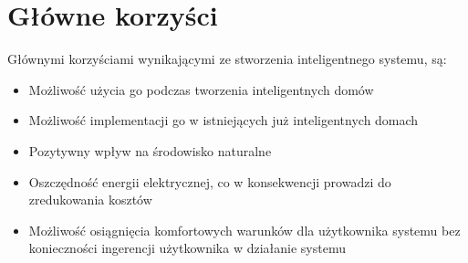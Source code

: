 \documentclass{article}
\begin{document}
\section{Główne korzyści}
Głównymi korzyściami wynikającymi ze stworzenia inteligentnego systemu, są:
\begin{itemize}
\item Możliwość użycia go podczas tworzenia inteligentnych domów
\item Możliwość implementacji go w istniejących już inteligentnych domach
\item Pozytywny wpływ na środowisko naturalne
\item Oszczędność energii elektrycznej, co w konsekwencji prowadzi do zredukowania kosztów
\item Możliwość osiągnięcia komfortowych warunków dla użytkownika systemu bez konieczności ingerencji użytkownika w działanie systemu
\end{itemize}
\newpage
\end{document}
